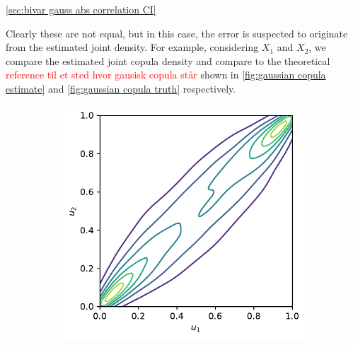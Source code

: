 \documentclass[../Thesis.tex]{subfiles}
\begin{document}
\begin{example}
    \autoref{sec:bivar gauss abs correlation CI}


    Clearly these are not equal, but in this case, the error is suspected to originate from the estimated joint density. For example, considering $X_1$ and $X_2$, we compare the estimated joint copula density and compare to the theoretical \textcolor{red}{reference til et sted hvor gausisk copula står} shown in \autoref{fig:gaussian copula estimate} and \autoref{fig:gaussian copula truth} respectively.
    \begin{figure}[H]
        \centering
        \begin{subfigure}[t]{0.45\linewidth}
            \centering
            \includegraphics[width = \linewidth]{figures/ND examples/Gaussian copula sample contour.pdf}
            \caption{}
        \end{subfigure}%
        ~
        \begin{subfigure}[t]{0.5\linewidth}

\end{subfigure}
\end{figure}
\end{example}
\end{document}
